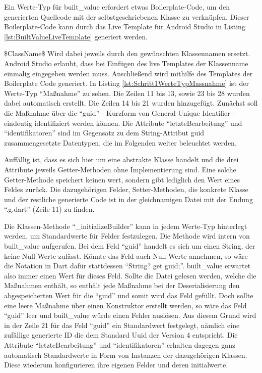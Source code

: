 Ein Werte-Typ für built_value erfordert etwas Boilerplate-Code,  um den generierten Quellcode mit der selbstgeschriebenen Klasse zu verknüpfen.  Dieser Boilerplate-Code kann durch das Live Template für Android Studio in Listing \ref{lst:BuiltValueLiveTemplate} generiert werden. 






\$ClassName\$ Wird dabei jeweils durch den gewünschten Klassennamen ersetzt. Android Studio erlaubt, dass bei Einfügen des live Templates der Klassenname einmalig eingegeben werden muss.  Anschließend wird mithilfe des Templates der Boilerplate Code generiert. In Listing \ref{lst:Schritt1WerteTypMassnahme} ist der Werte-Typ \enquote{Maßnahme} zu sehen. Die Zeilen 11 bis 13, sowie 23 bis 28 wurden dabei automatisch erstellt. Die Zeilen 14 bis 21 wurden hinzugefügt. Zunächst soll die Maßnahme über die \enquote{guid} - Kurzform von General Unique Identifier - eindeutig identifiziert werden können.
Die Attribute \enquote{letzteBearbeitung} und \enquote{identifikatoren} sind im Gegensatz zu dem String-Attribut guid zusammengesetzte Datentypen, die im Folgenden weiter beleuchtet werden.

Auffällig ist, dass es sich hier um eine abstrakte Klasse handelt und die drei Attribute jeweils Getter-Methoden ohne Implementierung sind. Eine solche Getter-Methode speichert keinen wert, sondern gibt lediglich den Wert eines Feldes zurück. Die dazugehörigen Felder,  Setter-Methoden, die konkrete Klasse und der restliche generierte Code ist in der gleichnamigen Datei mit der Endung \enquote{.g.dart} (Zeile 11) zu finden.

Die Klassen-Methode \enquote{_initializeBuilder} kann in jedem Werte-Typ hinterlegt werden, um Standardwerte für Felder festzulegen.
Die Methode wird intern von built_value aufgerufen. Bei dem Feld \enquote{guid} handelt es sich um einen String, der keine Null-Werte zulässt. Könnte das Feld auch Null-Werte annehmen, so wäre die Notation in Dart dafür stattdessen \enquote{String? get guid;}. built_value erwartet also immer einen Wert für dieses Feld. Sollte die Datei gelesen werden, welche die Maßnahmen enthält, so enthält jede Maßnahme bei der Deserialisierung den abgespeicherten Wert für die \enquote{guid} und somit wird das Feld gefüllt. Doch sollte eine leere Maßnahme über einen Konstruktor erstellt werden, so wäre das Feld \enquote{guid} leer und built_value würde einen Fehler auslösen. Aus diesem Grund wird in der Zeile 21 für das Feld \enquote{guid} ein Standardwert festgelegt, nämlich eine zufällige  generierte ID die dem Standard Uuid der Version 4 entspricht. 
Die Attribute \enquote{letzteBearbeitung} und \enquote{identifikatoren} erhalten dagegen ganz automatisch Standardwerte in Form von Instanzen der dazugehörigen Klassen. Diese wiederum konfigurieren ihre eigenen Felder und deren initialwerte.

